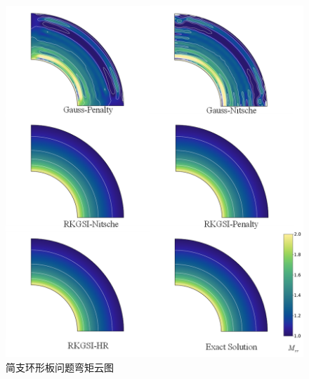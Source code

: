 \begin{figure}[H]
    \centering
    \includegraphics[scale=0.7]{figure/PHR/A/Mxy.png}
    \caption{简支环形板问题弯矩云图}\label{AMxy}
\end{figure}
